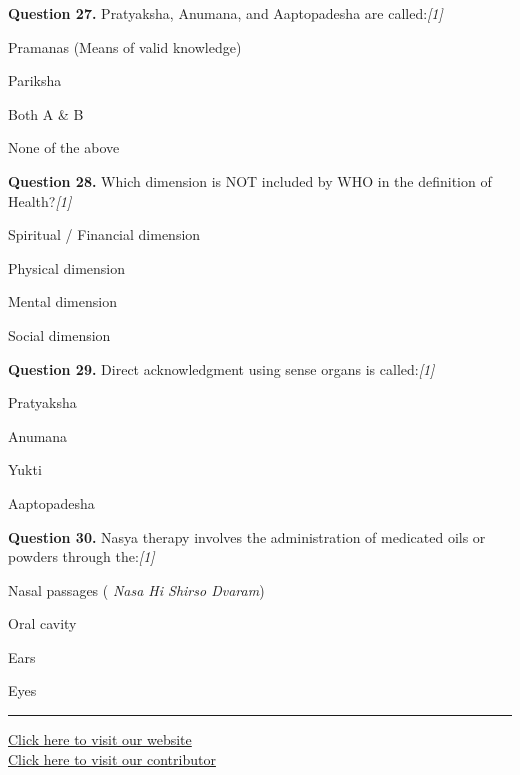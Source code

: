 \documentclass[11pt,a4paper]{article}
\newcommand{\pts}[1]{\hfill   \textit{[#1]}}
\begin{document}
\noindent   \textbf{Question 27.} Pratyaksha, Anumana, and Aaptopadesha are called:\pts{1}

\begin{parts}
  \item Pramanas (Means of valid knowledge)
  \item Pariksha
  \item Both A \& B
  \item None of the above
\end{parts}

\medskip




\noindent   \textbf{Question 28.} Which dimension is NOT included by WHO in the definition of Health?\pts{1}

\begin{parts}
  \item Spiritual / Financial dimension
  \item Physical dimension
  \item Mental dimension
  \item Social dimension
\end{parts}

\medskip




\noindent   \textbf{Question 29.} Direct acknowledgment using sense organs is called:\pts{1}

\begin{parts}
  \item Pratyaksha
  \item Anumana
  \item Yukti
  \item Aaptopadesha
\end{parts}

\medskip




\noindent   \textbf{Question 30.} Nasya therapy involves the administration of medicated oils or powders through the:\pts{1}

\begin{parts}
  \item Nasal passages (   \textit{Nasa Hi Shirso Dvaram})
  \item Oral cavity
  \item Ears
  \item Eyes
\end{parts}

\vfill
\rule{\linewidth}{0.4pt}

\begin{center}\small
\href{https://bhu-exam.vercel.app/}{Click here to visit our website}\\[4pt]
\href{https://me-aryan.vercel.app/}{Click here to visit our contributor}
\end{center}
\end{document}
